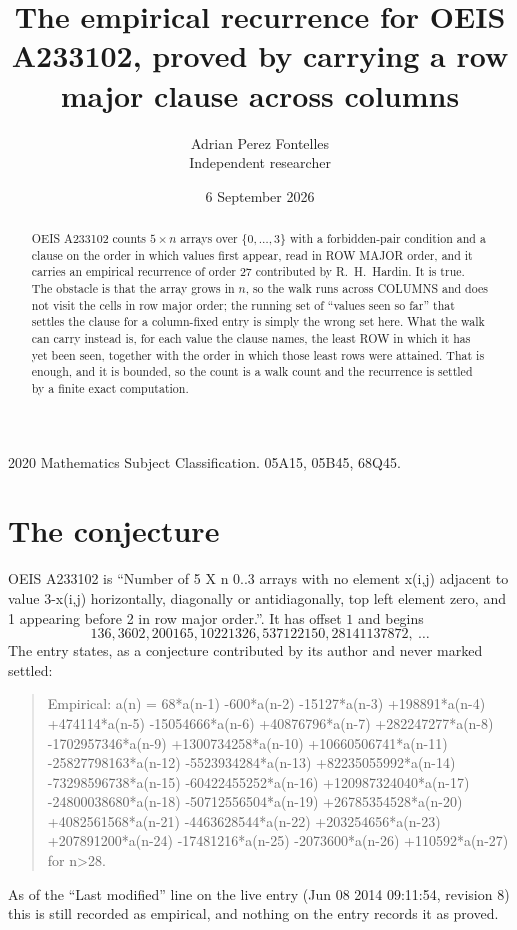 \documentclass[11pt,a4paper]{article}
\title{The empirical recurrence for OEIS A233102, proved by carrying a row major clause across
columns}
\author{Adrian Perez Fontelles\\ \small Independent researcher}
\date{6 September 2026}
\theoremstyle{plain}
\theoremstyle{definition}
\begin{document}
\maketitle

\begin{abstract}
OEIS A233102 counts $5\times n$ arrays over $\{0,\dots,3\}$ with a forbidden-pair
condition and a clause on the order in which values first appear, read in ROW MAJOR order, and
it carries an empirical recurrence of order $27$ contributed by R.~H.~Hardin. It is true.
The obstacle is that the array grows in $n$, so the walk runs across COLUMNS and does not visit
the cells in row major order; the running set of ``values seen so far'' that settles the clause
for a column-fixed entry is simply the wrong set here. What the walk can carry instead is, for
each value the clause names, the least ROW in which it has yet been seen, together with the
order in which those least rows were attained. That is enough, and it is bounded, so the count
is a walk count and the recurrence is settled by a finite exact computation.
\end{abstract}

\noindent\small 2020 Mathematics Subject Classification. 05A15, 05B45, 68Q45.\normalsize

\section{The conjecture}

OEIS A233102 is ``Number of 5 X n 0..3 arrays with no element x(i,j) adjacent to value 3-x(i,j) horizontally, diagonally or antidiagonally, top left element zero, and 1 appearing before 2 in row major order.''. It has offset $1$ and begins
\[
136, 3602, 200165, 10221326, 537122150, 28141137872,\ \dots
\]
The entry states, as a conjecture contributed by its author and never marked settled:
\begin{quote}
Empirical: a(n) = 68*a(n-1) -600*a(n-2) -15127*a(n-3) +198891*a(n-4) +474114*a(n-5) -15054666*a(n-6) +40876796*a(n-7) +282247277*a(n-8) -1702957346*a(n-9) +1300734258*a(n-10) +10660506741*a(n-11) -25827798163*a(n-12) -5523934284*a(n-13) +82235055992*a(n-14) -73298596738*a(n-15) -60422455252*a(n-16) +120987324040*a(n-17) -24800038680*a(n-18) -50712556504*a(n-19) +26785354528*a(n-20) +4082561568*a(n-21) -4463628544*a(n-22) +203254656*a(n-23) +207891200*a(n-24) -17481216*a(n-25) -2073600*a(n-26) +110592*a(n-27) for n>28.
\end{quote}
As of the ``Last modified'' line on the live entry (Jun 08 2014 09:11:54, revision 8) this is still
recorded as empirical, and nothing on the entry records it as proved.
\end{document}

